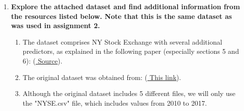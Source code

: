 \documentclass[12pt]{article}
\begin{document}



\pagebreak

\begin{enumerate}

\item \textbf{Explore the attached dataset and find additional information from the resources listed below.  Note that this is the same dataset as was used in assignment 2.}
\begin{enumerate}
\item The dataset comprises NY Stock Exchange with several additional predictors, as explained in the following paper (especially sections 5 and 6):  (\href{https://www.sciencedirect.com/science/article/abs/pii/S0957417419301915}{ Source}).
\item The original dataset was obtained from: (\href{https://archive.ics.uci.edu/ml/datasets/CNNpred\%3A+CNN-based+stock+market+prediction+using+a+diverse+set+of+variablesc}{ This link}).
\item Although the original dataset includes 5 different files, we will only use the "NYSE.csv" file, which includes values from 2010 to 2017.
\end{enumerate}



\newpage

\newpage

\newpage

%









\end{enumerate}
\end{document}
